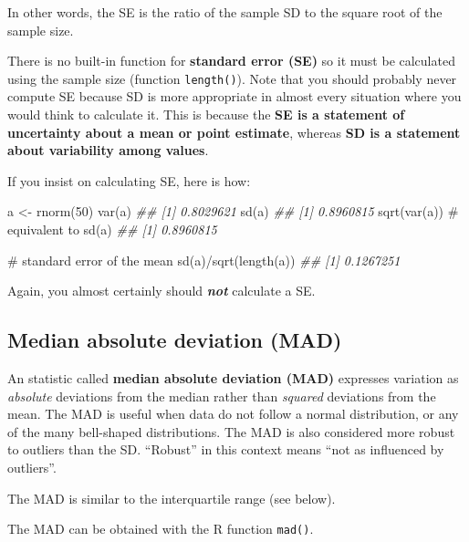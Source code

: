 \documentclass[
  13,
  letterpaper,
]{report}
\newenvironment{Shaded}{\begin{snugshade}}{\end{snugshade}}
\newcommand{\CommentTok}[1]{\textcolor[rgb]{0.37,0.37,0.37}{#1}}
\newcommand{\DecValTok}[1]{\textcolor[rgb]{0.68,0.00,0.00}{#1}}
\newcommand{\DocumentationTok}[1]{\textcolor[rgb]{0.37,0.37,0.37}{\textit{#1}}}
\newcommand{\FunctionTok}[1]{\textcolor[rgb]{0.28,0.35,0.67}{#1}}
\newcommand{\NormalTok}[1]{\textcolor[rgb]{0.00,0.23,0.31}{#1}}
\newcommand{\OtherTok}[1]{\textcolor[rgb]{0.00,0.23,0.31}{#1}}
\newcommand{\SpecialCharTok}[1]{\textcolor[rgb]{0.37,0.37,0.37}{#1}}
\begin{document}
In other words, the SE is the ratio of the sample SD to the square root
of the sample size.

There is no built-in function for \textbf{standard error (SE)} so it
must be calculated using the sample size (function \texttt{length()}).
Note that you should probably never compute SE because SD is more
appropriate in almost every situation where you would think to calculate
it. This is because the \textbf{SE is a statement of uncertainty about a
mean or point estimate}, whereas \textbf{SD is a statement about
variability among values}.

If you insist on calculating SE, here is how:

\begin{Shaded}
\begin{Highlighting}[]

\NormalTok{a }\OtherTok{\textless{}{-}} \FunctionTok{rnorm}\NormalTok{(}\DecValTok{50}\NormalTok{)}
\FunctionTok{var}\NormalTok{(a)}
\DocumentationTok{\#\# [1] 0.8029621}
\FunctionTok{sd}\NormalTok{(a)}
\DocumentationTok{\#\# [1] 0.8960815}
\FunctionTok{sqrt}\NormalTok{(}\FunctionTok{var}\NormalTok{(a)) }\CommentTok{\# equivalent to sd(a)}
\DocumentationTok{\#\# [1] 0.8960815}

\CommentTok{\# standard error of the mean}
\FunctionTok{sd}\NormalTok{(a)}\SpecialCharTok{/}\FunctionTok{sqrt}\NormalTok{(}\FunctionTok{length}\NormalTok{(a))}
\DocumentationTok{\#\# [1] 0.1267251}
\end{Highlighting}
\end{Shaded}

Again, you almost certainly should \textbf{\emph{not}} calculate a SE.

\subsection{Median absolute deviation (MAD)}\label{sec-desc-var-mad}

An statistic called \textbf{median absolute deviation (MAD)} expresses
variation as \emph{absolute} deviations from the median rather than
\emph{squared} deviations from the mean. The MAD is useful when data do
not follow a normal distribution, or any of the many bell-shaped
distributions. The MAD is also considered more robust to outliers than
the SD. ``Robust'' in this context means ``not as influenced by
outliers''.

The MAD is similar to the interquartile range (see below).

The MAD can be obtained with the R function \texttt{mad()}.
\end{document}
